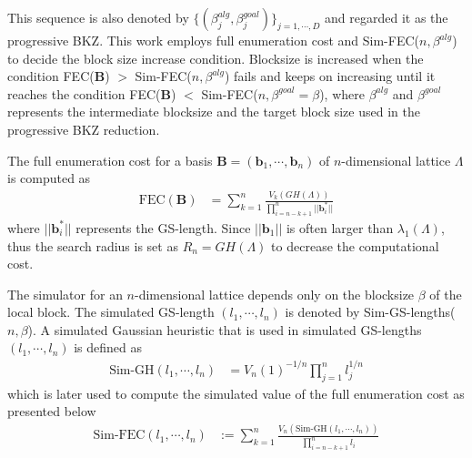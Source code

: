 This sequence is also denoted by $\{(\beta_j^{alg},\beta_j^{goal})\}_{j=1,\cdots,D}$ and regarded it as the progressive BKZ.
This work employs full enumeration cost and Sim-FEC($n,\beta^{alg}$) to decide the block size increase condition.
Blocksize is increased when the condition  FEC($\pmb{B}$) $>$ Sim-FEC($n,\beta^{alg}$) fails and keeps on increasing until it reaches the condition FEC($\pmb{B}$) $<$ Sim-FEC($n,\beta^{goal}=\beta$), where $\beta^{alg}$ and $\beta^{goal}$ represents the intermediate blocksize and the target block size used in the progressive BKZ reduction.

The full enumeration cost for a basis $\pmb{B} = (\pmb{b}_1 , \cdots , \pmb{b}_n)$ of $n$-dimensional lattice $\Lambda$ is computed as
\begin{align*}
    \text{FEC}(\pmb{B}) & = \sum_{k=1}^n \frac{V_k(GH(\Lambda))}{\prod_{i=n-k+1}^n ||\pmb{b}_i^*||}
\end{align*}
where $||\pmb{b}_i^*||$ represents the GS-length.
Since $||\pmb{b}_1||$ is often larger than $\lambda_1(\Lambda)$, thus the search radius is set as $R_n=GH(\Lambda)$ to decrease the computational cost.


The simulator for an $n$-dimensional lattice depends only on the blocksize $\beta$ of the local block.
The simulated GS-length $(l_1 ,\cdots , l_n)$ is denoted by Sim-GS-lengths($n,\beta$).
A simulated Gaussian heuristic that is used in simulated GS-lengths$(l_1,\cdots,l_n)$ is defined as
\begin{align*}
    \text{Sim-GH}(l_1 , \cdots , l_n) & = V_n(1)^{-1/n} \prod_{j=1}^n l_j^{1/n}
\end{align*}
which is later used to compute the simulated value of the full enumeration cost as presented below
\begin{align*}
    \text{Sim-FEC}(l_1 , \cdots , l_n) & := \sum_{k=1}^n \frac{V_n(\text{Sim-GH}(l_1,\cdots,l_n))}{\prod_{i=n-k+1}^n l_i}
\end{align*}



